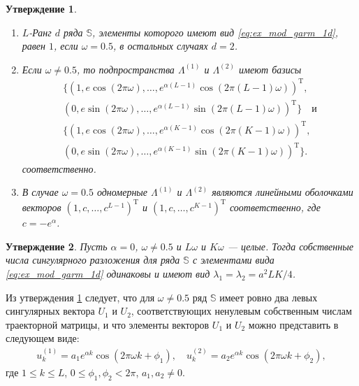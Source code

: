 \documentclass[specialist,
               substylefile = spbu.rtx,
               subf,href,colorlinks=true, 12pt]{disser}
\newtheorem{Th}{Утверждение}
\begin{document}
\begin{Th} \cite[Section 5.1]{Golyandina.etal2001} \label{th:ex_mod_1d}
\begin{enumerate}
\item $L$-Ранг $d$ ряда $\mathbb{S}$, элементы которого имеют вид \eqref{eq:ex_mod_garm_1d},  равен $1$, если $\omega = 0.5$, в остальных случаях $d=2$.
\item Если $\omega \not = 0.5$, то подпространства $\Lambda^{(1)}$ и $\Lambda^{(2)}$ имеют базисы \\
\begin{gather*}
\{(1, e\cos(2\pi\omega),\ldots,e^{\alpha (L-1)}\cos(2\pi (L-1) \omega))^\mathrm{T}, \\
(0, e\sin(2\pi\omega),\ldots,e^{\alpha (L-1)}\sin(2\pi (L-1) \omega))^\mathrm{T}\} \quad \text{и} \\
\{(1, e\cos(2\pi\omega),\ldots,e^{\alpha (K-1)}\cos(2\pi (K-1) \omega))^\mathrm{T}, \\
(0, e\sin(2\pi\omega),\ldots,e^{\alpha (K-1)}\sin(2\pi (K-1) \omega))^\mathrm{T}\}.
\end{gather*}
соответственно.
\item В случае $\omega = 0.5$ одномерные $\Lambda^{(1)}$ и $\Lambda^{(2)}$ являются линейными оболочками векторов $(1,c,\ldots,c^{L-1})^{\mathrm{T}}$ и $(1,c,\ldots,c^{K-1})^{\mathrm{T}}$ соответственно, где $c = -e^{\alpha}$.
\end{enumerate}
\end{Th}

\begin{Th} \cite[Предложение 2.3]{Golyandina.etal2003} \label{th:1dssa_num}
Пусть $\alpha = 0$, $\omega \not = 0.5$ и $L\omega$  и $K\omega$ --- целые. Тогда собственные числа сингулярного разложения для ряда $\mathbb{S}$ с элементами вида \eqref{eq:ex_mod_garm_1d} одинаковы и имеют вид $\lambda_1=\lambda_2=a^2LK/4$.
\end{Th}

Из утверждения \ref{th:ex_mod_1d} следует, что для $\omega \not = 0.5$ ряд $\mathbb{S}$ имеет ровно два левых сингулярных вектора $U_1$ и $U_2$, соответствующих ненулевым собственным числам траекторной матрицы,
и что элементы векторов $U_1$ и $U_2$ можно представить в следующем виде:
\begin{gather} \label{eq:vectors_ex_mod_1d}
	u_k^{(1)} = a_1 e^{\alpha k} \cos(2\pi\omega k + \phi_1), \quad u_k^{(2)} = a_2 e^{\alpha k}\cos(2\pi\omega k + \phi_2),
\end{gather}
где $1 \leqslant k \leqslant L$, $0 \leqslant \phi_1, \phi_2 < 2\pi$, $a_1, a_2 \not = 0$.
\end{document}
